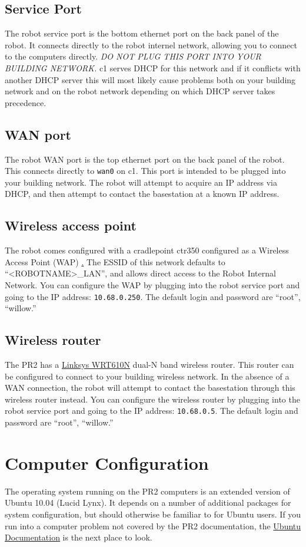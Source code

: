 \subsection{Service Port} The robot service port is the bottom
ethernet port on the back panel of the robot.  It connects directly to
the robot internel network, allowing you to connect to the computers
directly.  \textit{DO NOT PLUG THIS PORT INTO YOUR BUILDING NETWORK.}
c1 serves DHCP for this network and if it conflicts with another DHCP
server this will most likely cause problems both on your building
network and on the robot network depending on which DHCP server takes
precedence.
\subsection{WAN port} The robot WAN port is the top ethernet port on
the back panel of the robot.  This connects directly to \texttt{wan0}
on c1.  This port is intended to be plugged into your building
network.  The robot will attempt to acquire an IP address via DHCP,
and then attempt to contact the basestation at a known IP address.
\subsection{Wireless access point} The robot comes configured with a
cradlepoint ctr350 configured as a Wireless Access Point (WAP)
\href{http://www.cradlepoint.com/products/ctr350-mobile-broadband-router}.
The ESSID of this network defaults to ``<ROBOTNAME>\_LAN'', and allows
direct access to the Robot Internal Network.  You can configure the
WAP by plugging into the robot service port and going to the IP
address: \texttt{10.68.0.250}.  The default login and password are
``root'', ``willow.''

\subsection{Wireless router}
The PR2 has a
\href{http://www.linksysbycisco.com/US/en/products/WRT610N}{Linksys
  WRT610N} dual-N band wireless router.  This router can be configured
to connect to your building wireless network.  In the absence of a WAN
connection, the robot will attempt to contact the basestation through
this wireless router instead. You can configure the wireless router by
plugging into the robot service port and going to the IP address:
\texttt{10.68.0.5}.  The default login and password are ``root'',
``willow.''

\section{Computer Configuration}
The operating system running on the PR2 computers is an extended
version of Ubuntu 10.04 (Lucid Lynx). It depends on a number of
additional packages for system configuration, but should otherwise be
familiar to for Ubuntu users. If you run into a computer problem not
covered by the PR2 documentation, the
\href{https://help.ubuntu.com/10.04/index.html}{Ubuntu Documentation}
is the next place to look.

